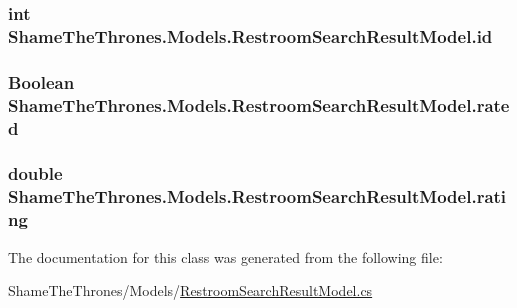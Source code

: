 \subsubsection[{\texorpdfstring{id}{id}}]{\setlength{\rightskip}{0pt plus 5cm}int Shame\+The\+Thrones.\+Models.\+Restroom\+Search\+Result\+Model.\+id}\hypertarget{class_shame_the_thrones_1_1_models_1_1_restroom_search_result_model_a108d2f8a6fd3da3a3768029a6f8ddad5}{}\label{class_shame_the_thrones_1_1_models_1_1_restroom_search_result_model_a108d2f8a6fd3da3a3768029a6f8ddad5}
\subsubsection[{\texorpdfstring{rated}{rated}}]{\setlength{\rightskip}{0pt plus 5cm}Boolean Shame\+The\+Thrones.\+Models.\+Restroom\+Search\+Result\+Model.\+rated}\hypertarget{class_shame_the_thrones_1_1_models_1_1_restroom_search_result_model_a7df672c3c5a1746b72468db0a97db7f5}{}\label{class_shame_the_thrones_1_1_models_1_1_restroom_search_result_model_a7df672c3c5a1746b72468db0a97db7f5}
\subsubsection[{\texorpdfstring{rating}{rating}}]{\setlength{\rightskip}{0pt plus 5cm}double Shame\+The\+Thrones.\+Models.\+Restroom\+Search\+Result\+Model.\+rating}\hypertarget{class_shame_the_thrones_1_1_models_1_1_restroom_search_result_model_ad6e9121e260b7c7ae8ddc5ca0a554742}{}\label{class_shame_the_thrones_1_1_models_1_1_restroom_search_result_model_ad6e9121e260b7c7ae8ddc5ca0a554742}


The documentation for this class was generated from the following file\+:\begin{DoxyCompactItemize}
\item 
Shame\+The\+Thrones/\+Models/\hyperlink{_restroom_search_result_model_8cs}{Restroom\+Search\+Result\+Model.\+cs}\end{DoxyCompactItemize}
